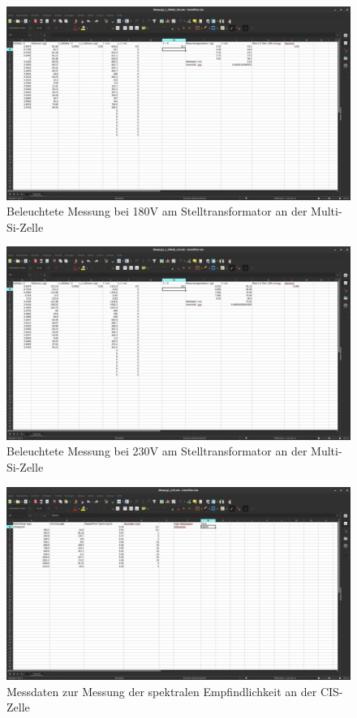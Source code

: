 \begin{figure}[h]
    \captionsetup{justification=centering,margin=2cm}
    \centering
    \includegraphics[angle = 90, width = 12cm]{Bilder/Daten/MessungMultiSi180.png}
    \caption{Beleuchtete Messung bei 180V am Stelltransformator an der Multi-Si-Zelle}
\end{figure}



\begin{figure}[h]
    \captionsetup{justification=centering,margin=2cm}
    \centering
    \includegraphics[angle = 90, width = 12cm]{Bilder/Daten/MessungMultiSi230.png}
    \caption{Beleuchtete Messung bei 230V am Stelltransformator an der Multi-Si-Zelle}
\end{figure}






\begin{figure}[h]
    \captionsetup{justification=centering,margin=2cm}
    \centering
    \includegraphics[angle = 90, width = 12cm]{Bilder/Daten/MessunngCIS.png}
    \caption{Messdaten zur Messung der spektralen Empfindlichkeit an der CIS-Zelle}
\end{figure}

